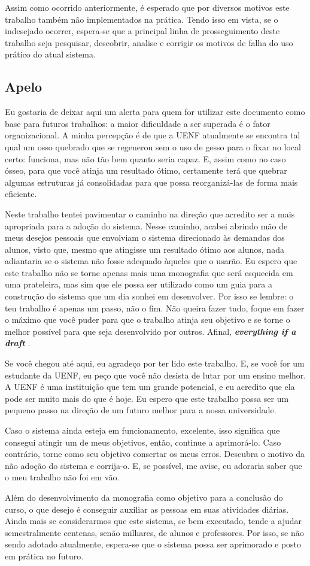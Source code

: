 Assim como ocorrido anteriormente, é esperado que por diversos motivos este trabalho também não implementados na prática. Tendo isso em vista, se o indesejado ocorrer, espera-se que a principal linha de prosseguimento deste trabalho seja pesquisar, descobrir, analise e corrigir os motivos de falha do uso prático do atual sistema.

\subsection*{Apelo}

Eu gostaria de deixar aqui um alerta para quem for utilizar este documento como base para futuros trabalhos: a maior dificuldade a ser superada é o fator organizacional. A minha percepção é de que a UENF atualmente se encontra tal qual um osso quebrado que se regenerou sem o uso de gesso para o fixar no local certo: funciona, mas não tão bem quanto seria capaz. E, assim como no caso ósseo, para que você atinja um resultado ótimo, certamente terá que quebrar algumas estruturas já consolidadas para que possa reorganizá-las de forma mais eficiente.

Neste trabalho tentei pavimentar o caminho na direção que acredito ser a mais apropriada para a adoção do sistema. Nesse caminho, acabei abrindo mão de meus desejos pessoais que envolviam o sistema direcionado às demandas dos alunos, visto que, mesmo que atingisse um resultado ótimo aos alunos, nada adiantaria se o sistema não fosse adequado àqueles que o usarão. Eu espero que este trabalho não se torne apenas mais uma monografia que será esquecida em uma prateleira, mas sim que ele possa ser utilizado como um guia para a construção do sistema que um dia sonhei em desenvolver. Por isso se lembre: o teu trabalho é apenas um passo, não o fim. Não queira fazer tudo, foque em fazer o máximo que você puder para que o trabalho atinja seu objetivo e se torne o melhor possível para que seja desenvolvido por outros. Afinal, \textbf{\textit{everything if a draft}} \cite{TheCultOfDone2016}.

Se você chegou até aqui, eu agradeço por ter lido este trabalho. E, se você for um estudante da UENF, eu peço que você não desista de lutar por um ensino melhor. A UENF é uma instituição que tem um grande potencial, e eu acredito que ela pode ser muito mais do que é hoje. Eu espero que este trabalho possa ser um pequeno passo na direção de um futuro melhor para a nossa universidade.

Caso o sistema ainda esteja em funcionamento, excelente, isso significa que consegui atingir um de meus objetivos, então, continue a aprimorá-lo. Caso contrário, torne como seu objetivo consertar os meus erros. Descubra o motivo da não adoção do sistema e corrija-o. E, se possível, me avise, eu adoraria saber que o meu trabalho não foi em vão.

Além do desenvolvimento da monografia como objetivo para a conclusão do curso, o que desejo é conseguir auxiliar as pessoas em suas atividades diárias. Ainda mais se considerarmos que este sistema, se bem executado, tende a ajudar semestralmente centenas, senão milhares, de alunos e professores. Por isso, se não sendo adotado atualmente, espera-se que o sistema possa ser aprimorado e posto em prática no futuro.

